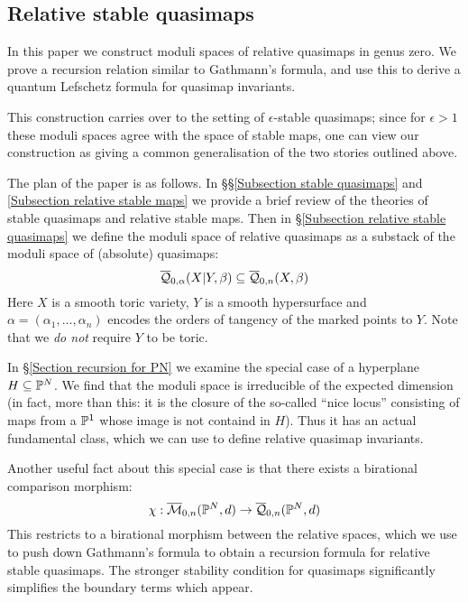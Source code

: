 \subsection{Relative stable quasimaps}
In this paper we construct moduli spaces of relative quasimaps in genus zero. We prove a recursion relation similar to Gathmann's formula, and use this to derive a quantum Lefschetz formula for quasimap invariants.

This construction carries over to the setting of $\epsilon$-stable quasimaps; since for $\epsilon > 1$ these moduli spaces agree with the space of stable maps, one can view our construction as giving a common generalisation of the two stories outlined above.

The plan of the paper is as follows. In \S\S \ref{Subsection stable quasimaps} and \ref{Subsection relative stable maps} we provide a brief review of the theories of stable quasimaps and relative stable maps. Then in \S \ref{Subsection relative stable quasimaps} we define the moduli space of relative quasimaps as a substack of the moduli space of (absolute) quasimaps:
\begin{equation*} \overline{\mathcal Q}_{0,\alpha}(X|Y,\beta) \subseteq \overline{\mathcal Q}_{0,n}(X,\beta) \end{equation*}
Here $X$ is a smooth toric variety, $Y$ is a smooth hypersurface and $\alpha = (\alpha_1, \ldots, \alpha_n)$ encodes the orders of tangency of the marked points to $Y$. Note that we \emph{do not} require $Y$ to be toric.

In \S \ref{Section recursion for PN} we examine the special case of a hyperplane $H \subseteq \mathbb P^N$. We find that the moduli space is irreducible of the expected dimension (in fact, more than this: it is the closure of the so-called ``nice locus'' consisting of maps from a $\mathbb P^1$ whose image is not containd in $H$). Thus it has an actual fundamental class, which we can use to define relative quasimap invariants.

Another useful fact about this special case is that there exists a birational comparison morphism:
\begin{equation*} \chi : \overline{\mathcal M}_{0,n}(\mathbb P^N,d) \rightarrow \overline{\mathcal Q}_{0,n}(\mathbb P^N,d) \end{equation*}
This restricts to a birational morphism between the relative spaces, which we use to push down Gathmann's formula to obtain a recursion formula for relative stable quasimaps. The stronger stability condition for quasimaps significantly simplifies the boundary terms which appear.

